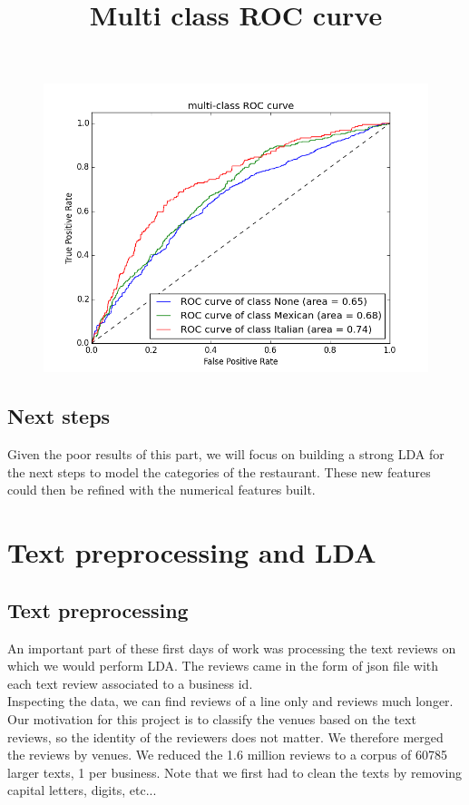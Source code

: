 \documentclass[paper=a4, fontsize=11pt]{scrartcl} %
\numberwithin{equation}{section}
\numberwithin{figure}{section}
\numberwithin{table}{section}
\begin{document}
\begin{figure}[H]
	\includegraphics[scale=0.45]{ROC.png}
	\centering
	\title{Multi class ROC curve}
\end{figure}

\subsection{Next steps}

Given the poor results of this part, we will focus on building a strong LDA for the next steps to model the categories of the restaurant. These new features could then be refined with the numerical features built.

\section{Text preprocessing and LDA}
\subsection{Text preprocessing}
An important part of these first days of work was processing the text reviews on which we would perform LDA. The reviews came in the form of json file with each text review associated to a business id.\\

Inspecting the data, we can find reviews of a line only and reviews much longer. Our motivation for this project is to classify the venues based on the text reviews, so the identity of the reviewers does not matter. We therefore merged the reviews by venues. We reduced the 1.6 million reviews to a corpus of 60785 larger texts, 1 per business. Note that we first had to clean the texts by removing capital letters, digits, etc... \\
\end{document}
